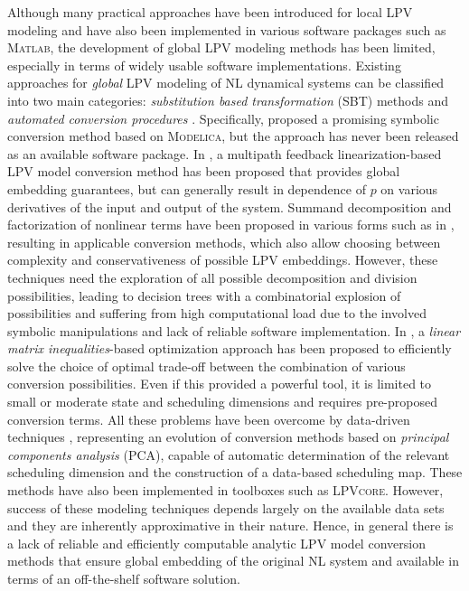 Although many practical approaches have been introduced for local LPV modeling and have also been implemented in various software packages such as \textsc{Matlab}, the development of global LPV modeling methods has been limited, especially in terms of widely usable software implementations.
Existing approaches for \emph{global} LPV modeling of NL dynamical systems can be classified into two main categories: \emph{substitution based transformation} (SBT) methods \citep{Shamma93, Papageorgiou00,Bokor2007,Toth11ACC_Philips,Rugh00,Leith98b,Marcos04} and \emph{automated conversion procedures} \citep{Donida2009,Kwiatkowski06,Kwiatkowski4494453,Toth2010SpringerBook,Hoffmann2015,Toth19TAC,Toth20bIET,ROTONDO201544}. Specifically, \cite{Donida2009} proposed a promising symbolic conversion method based on \textsc{Modelica}, but the approach has never been released as an available software package. In \cite{Toth19TAC}, a multipath feedback linearization-based LPV model conversion method has been proposed that provides global embedding guarantees, but can generally result in dependence of $p$ on various derivatives of the input and output of the system.
Summand decomposition and factorization of nonlinear terms have been proposed in various forms such as in \cite{Kwiatkowski06,Toth2010SpringerBook,ROTONDO201544}, resulting in applicable conversion methods, which also allow choosing between complexity and conservativeness of possible LPV embeddings. However, these techniques need the exploration of all possible decomposition and division possibilities, leading to decision trees with a combinatorial explosion of possibilities and suffering from high computational load due to the involved symbolic manipulations and lack of reliable software implementation. In \cite{Hoffmann2015}, a \emph{linear matrix inequalities}-based optimization approach has been proposed to efficiently solve the choice of optimal trade-off between the combination of various conversion possibilities. Even if this provided a powerful tool, it is limited to small or moderate state and scheduling dimensions and requires pre-proposed conversion terms. All these problems have been overcome by data-driven techniques \citep{Kwiatkowski4494453,Toth20bIET}, representing an evolution of conversion methods based on \emph{principal components analysis} (PCA), capable of automatic determination of the relevant scheduling dimension and the construction of a data-based scheduling map. These methods have also been implemented in toolboxes such as \textsc{LPVcore}. However, success of these modeling techniques depends largely on the available data sets and they are inherently approximative in their nature. Hence, in general there is a lack of reliable and efficiently computable analytic LPV model conversion methods that ensure global embedding of the original NL system and available in terms of an off-the-shelf software solution.

